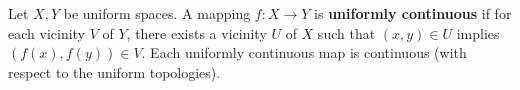 Let $X, Y$ be uniform spaces. A mapping $f: X \to Y$ is \textbf{uniformly continuous} if for each vicinity $V$ of $Y$, there exists a vicinity $U$ of $X$ such that $(x,y) \in U$ implies $(f(x), f(y)) \in V$. Each uniformly continuous map is continuous (with respect to the uniform topologies).

